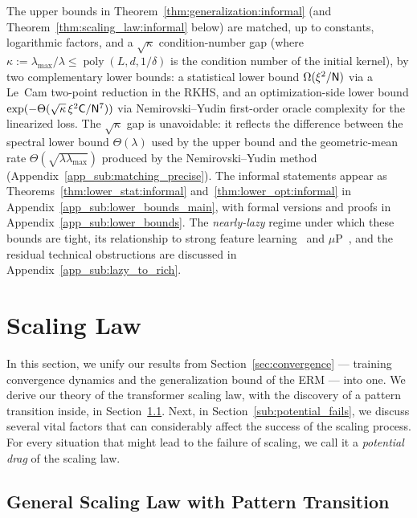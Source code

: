 \documentclass[11pt]{article}
\theoremstyle{plain}
\DeclareMathOperator{\poly}{poly}
\begin{document}
 The upper bounds in Theorem~\ref{thm:generalization:informal} (and Theorem~\ref{thm:scaling_law:informal} below) are matched, up to constants, logarithmic factors, and a $\sqrt{\kappa}$ condition-number gap (where $\kappa:=\lambda_{\max}/\lambda\le\poly(L,d,1/\delta)$ is the condition number of the initial kernel), by two complementary lower bounds: a statistical lower bound $\Omega(\xi^2/{\sf N})$ via a Le~Cam two-point reduction in the RKHS, and an optimization-side lower bound $\exp(-\Theta(\sqrt{\kappa}\,\xi^2{\sf C}/{\sf N}^7))$ via Nemirovski--Yudin first-order oracle complexity for the linearized loss. The $\sqrt{\kappa}$ gap is unavoidable: it reflects the difference between the spectral lower bound $\Theta(\lambda)$ used by the upper bound and the geometric-mean rate $\Theta(\sqrt{\lambda\lambda_{\max}})$ produced by the Nemirovski--Yudin method (Appendix~\ref{app_sub:matching_precise}). The informal statements appear as Theorems~\ref{thm:lower_stat:informal} and~\ref{thm:lower_opt:informal} in Appendix~\ref{app_sub:lower_bounds_main}, with formal versions and proofs in Appendix~\ref{app_sub:lower_bounds}. The {\it nearly-lazy} regime under which these bounds are tight, its relationship to strong feature learning~\citep{boc+25, bap24} and $\mu$P~\citep{ynh+22}, and the residual technical obstructions are discussed in Appendix~\ref{app_sub:lazy_to_rich}.
\section{Scaling Law}\label{sec:scaling_law}

In this section, we unify our results from Section~\ref{sec:convergence} --- training convergence dynamics and the generalization bound of the ERM --- into one. We derive our theory of the transformer scaling law, with the discovery of a pattern transition inside, in Section~\ref{sub:scaling_law_and_pattern_transition}. Next, in Section~\ref{sub:potential_fails}, we discuss several vital factors that can considerably affect the success of the scaling process. For every situation that might lead to the failure of scaling, we call it a {\it potential drag} of the scaling law.

\subsection{General Scaling Law with Pattern Transition}\label{sub:scaling_law_and_pattern_transition}
\end{document}
